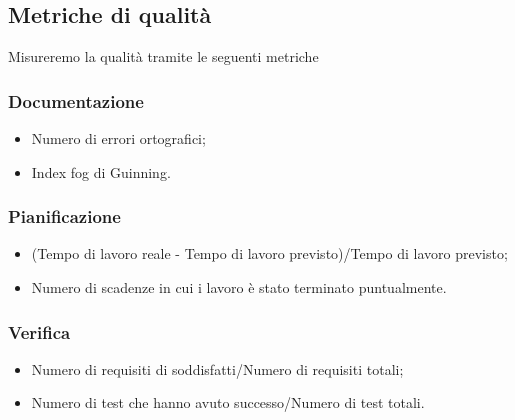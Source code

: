 \subsection{Metriche di qualità}
Misureremo la qualità tramite le seguenti metriche

\subsubsection{Documentazione}
\begin{itemize}
	\item Numero di errori ortografici;
	\item Index fog di Guinning.
\end{itemize} 

\subsubsection{Pianificazione}
\begin{itemize}
	\item (Tempo di lavoro reale - Tempo di lavoro previsto)/Tempo di lavoro previsto;
	\item Numero di scadenze in cui i lavoro è stato terminato puntualmente.
\end{itemize}

\subsubsection{Verifica}
\begin{itemize}
	\item Numero di requisiti di soddisfatti/Numero di requisiti totali;
	\item Numero di test che hanno avuto successo/Numero di test totali.
\end{itemize}
